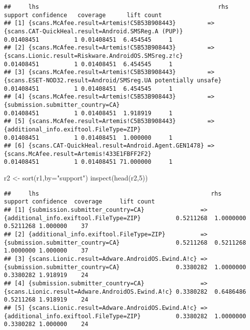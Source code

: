 \documentclass[
]{book}
\newenvironment{Shaded}{\begin{snugshade}}{\end{snugshade}}
\newcommand{\AttributeTok}[1]{\textcolor[rgb]{0.77,0.63,0.00}{#1}}
\newcommand{\DecValTok}[1]{\textcolor[rgb]{0.00,0.00,0.81}{#1}}
\newcommand{\FunctionTok}[1]{\textcolor[rgb]{0.00,0.00,0.00}{#1}}
\newcommand{\NormalTok}[1]{#1}
\newcommand{\OtherTok}[1]{\textcolor[rgb]{0.56,0.35,0.01}{#1}}
\newcommand{\StringTok}[1]{\textcolor[rgb]{0.31,0.60,0.02}{#1}}
\begin{document}
\begin{verbatim}
##     lhs                                                   rhs                                                               support confidence   coverage      lift count
## [1] {scans.McAfee.result=Artemis!C5B53B908443}         => {scans.CAT-QuickHeal.result=Android.SMSReg.A (PUP)}            0.01408451          1 0.01408451  6.454545     1
## [2] {scans.McAfee.result=Artemis!C5B53B908443}         => {scans.Lionic.result=Riskware.AndroidOS.SMSreg.z!c}            0.01408451          1 0.01408451  6.454545     1
## [3] {scans.McAfee.result=Artemis!C5B53B908443}         => {scans.ESET-NOD32.result=Android/SMSreg.UA potentially unsafe} 0.01408451          1 0.01408451  6.454545     1
## [4] {scans.McAfee.result=Artemis!C5B53B908443}         => {submission.submitter_country=CA}                              0.01408451          1 0.01408451  1.918919     1
## [5] {scans.McAfee.result=Artemis!C5B53B908443}         => {additional_info.exiftool.FileType=ZIP}                        0.01408451          1 0.01408451  1.000000     1
## [6] {scans.CAT-QuickHeal.result=Android.Agent.GEN1478} => {scans.McAfee.result=Artemis!433E1FBFF2F2}                     0.01408451          1 0.01408451 71.000000     1
\end{verbatim}

\begin{Shaded}
\begin{Highlighting}[]
\NormalTok{r2 }\OtherTok{\textless{}{-}} \FunctionTok{sort}\NormalTok{(r1,}\AttributeTok{by=}\StringTok{"support"}\NormalTok{)}
\FunctionTok{inspect}\NormalTok{(}\FunctionTok{head}\NormalTok{(r2,}\DecValTok{5}\NormalTok{))}
\end{Highlighting}
\end{Shaded}

\begin{verbatim}
##     lhs                                                 rhs                                                support confidence  coverage     lift count
## [1] {submission.submitter_country=CA}                => {additional_info.exiftool.FileType=ZIP}          0.5211268  1.0000000 0.5211268 1.000000    37
## [2] {additional_info.exiftool.FileType=ZIP}          => {submission.submitter_country=CA}                0.5211268  0.5211268 1.0000000 1.000000    37
## [3] {scans.Lionic.result=Adware.AndroidOS.Ewind.A!c} => {submission.submitter_country=CA}                0.3380282  1.0000000 0.3380282 1.918919    24
## [4] {submission.submitter_country=CA}                => {scans.Lionic.result=Adware.AndroidOS.Ewind.A!c} 0.3380282  0.6486486 0.5211268 1.918919    24
## [5] {scans.Lionic.result=Adware.AndroidOS.Ewind.A!c} => {additional_info.exiftool.FileType=ZIP}          0.3380282  1.0000000 0.3380282 1.000000    24
\end{verbatim}
\end{document}
